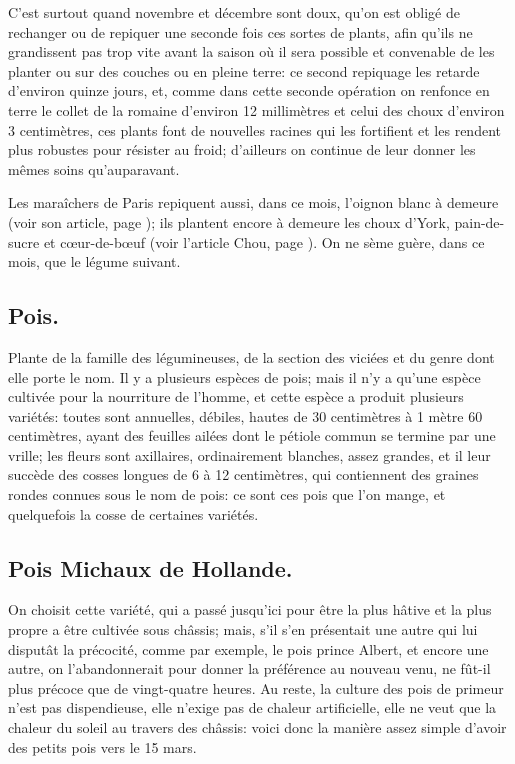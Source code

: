 \documentclass[10pt,a4paper]{book}
\begin{document}
C'est surtout quand novembre et décembre sont doux, qu'on est obligé de rechanger ou de repiquer une seconde fois ces sortes de plants, afin qu'ils ne grandissent pas trop vite avant la saison où il sera possible et convenable de les planter ou sur des couches ou en pleine terre: ce second repiquage les retarde d'environ quinze jours, et, comme dans cette seconde opération on renfonce en terre le collet de la romaine d'environ 12 millimètres et celui des choux d'environ 3 centimètres, ces plants font de nouvelles racines qui les fortifient et les rendent plus robustes pour résister au froid; d'ailleurs on continue de leur donner les mêmes soins qu'auparavant.

Les maraîchers de Paris repiquent aussi, dans ce mois, l'oignon blanc à demeure (voir son article, page \pageref{oignonblanc}); ils plantent encore à demeure les choux d'York, pain-de-sucre et cœur-de-bœuf (voir l'article Chou, page \pageref{chou}). On ne sème guère, dans ce mois, que le légume suivant.

\subsection{Pois.}

Plante de la famille des légumineuses, de la section des viciées et du genre dont elle porte le nom. Il y a plusieurs espèces de pois; mais il n'y a qu'une espèce cultivée pour la nourriture de l'homme, et cette espèce a produit plusieurs variétés: toutes sont annuelles, débiles, hautes de 30 centimètres à 1 mètre 60 centimètres, ayant des feuilles ailées dont le pétiole commun se termine par une vrille; les fleurs sont axillaires, ordinairement blanches, assez grandes, et il leur succède des cosses longues de 6 à 12 centimètres, qui contiennent des graines rondes connues sous le nom de pois: ce sont ces pois que l'on mange, et quelquefois la cosse de certaines variétés.

\subsection{Pois Michaux de Hollande.}

On choisit cette variété, qui a passé jusqu'ici pour être la plus hâtive et la plus propre a être cultivée sous châssis; mais, s'il s'en présentait une autre qui lui disputât la précocité, comme par exemple, le pois prince Albert, et encore une autre, on l'abandonnerait pour donner la préférence au nouveau venu, ne fût-il plus précoce que de vingt-quatre heures. Au reste, la culture des pois de primeur n'est pas dispendieuse, elle n'exige pas de chaleur artificielle, elle ne veut que la chaleur du soleil au travers des châssis: voici donc la manière assez simple d'avoir des petits pois vers le 15 mars.
\end{document}
